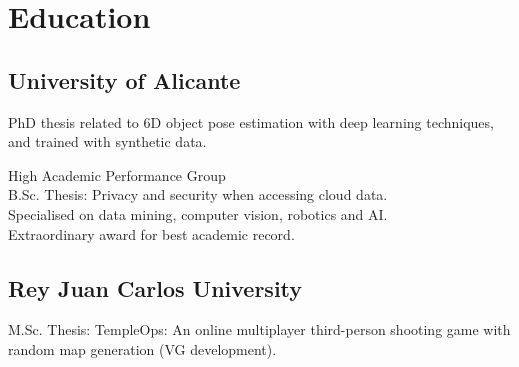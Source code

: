 \documentclass[]{deedy-resume-openfont}
\begin{document}
%
%

%
%





%
%

\begin{minipage}[t]{0.495\textwidth} 


\section{Education} 

\subsection{University of Alicante}
PhD thesis related to 6D object pose estimation with deep learning techniques, and trained with synthetic data.

\sectionsep

High Academic Performance Group \\
B.Sc. Thesis: Privacy and security when accessing cloud data.\\
Specialised on data mining, computer vision, robotics and AI.\\
Extraordinary award for best academic record.

\sectionsep


\sectionsep

\subsection{Rey Juan Carlos University}
M.Sc. Thesis: TempleOps: An online multiplayer third-person shooting game with random map generation (VG development).


\end{minipage}
\end{document}
